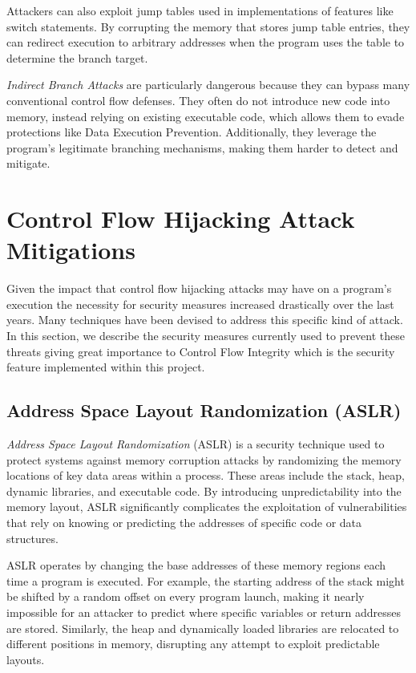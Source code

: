 Attackers can also exploit jump tables used in implementations of features like
switch statements. By corrupting the memory that stores jump table entries, they
can redirect execution to arbitrary addresses when the program uses the table to
determine the branch target.

\textit{Indirect Branch Attacks} are particularly dangerous because they can bypass
many conventional control flow defenses. They often do not introduce new code
into memory, instead relying on existing executable code, which allows them to
evade protections like Data Execution Prevention. Additionally, they leverage
the program's legitimate branching mechanisms, making them harder to detect and mitigate.

\section{Control Flow Hijacking Attack Mitigations}
\label{sec:background_mitigation}

Given the impact that control flow hijacking attacks may have on a program's
execution the necessity for security measures increased drastically over the
last years. Many techniques have been devised to address this specific kind of attack.
In this section, we describe the security measures currently used to prevent these
threats giving great importance to Control Flow Integrity which is the security feature
implemented within this project.

\subsection{Address Space Layout Randomization (ASLR)}
\label{subsec:background_aslr}

\textit{Address Space Layout Randomization} (ASLR) is a security technique used to
protect systems against memory corruption attacks by randomizing the memory locations
of key data areas within a process. These areas include the stack, heap, dynamic
libraries, and executable code. By introducing unpredictability into the memory
layout, ASLR significantly complicates the exploitation of vulnerabilities that rely
on knowing or predicting the addresses of specific code or data structures.

ASLR operates by changing the base addresses of these memory regions each time a
program is executed. For example, the starting address of the stack might be shifted
by a random offset on every program launch, making it nearly impossible for an
attacker to predict where specific variables or return addresses are stored. Similarly,
the heap and dynamically loaded libraries are relocated to different positions
in memory, disrupting any attempt to exploit predictable layouts.

